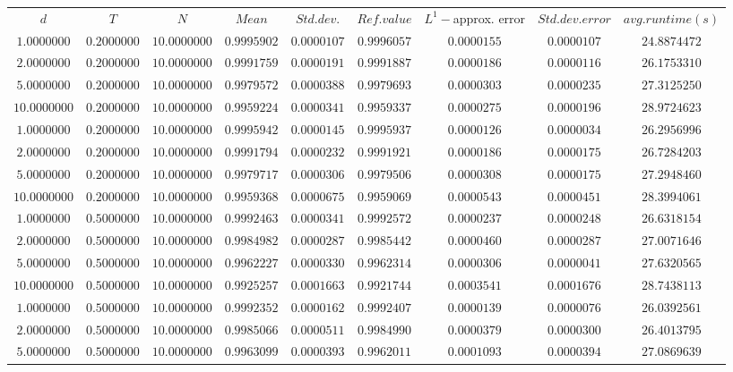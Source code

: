 \begin{tabular}{ccccccccc}
$d$ & $T$ & $N$ & $Mean$ & $Std. dev.$ & $Ref. value$ & $L^1-$approx. error & $Std. dev. error$ & $avg. runtime (s)$\\
$1.0000000$ & $0.2000000$ & $10.0000000$ & $0.9995902$ & $0.0000107$ & $0.9996057$ & $0.0000155$ & $0.0000107$ & $24.8874472$\\
$2.0000000$ & $0.2000000$ & $10.0000000$ & $0.9991759$ & $0.0000191$ & $0.9991887$ & $0.0000186$ & $0.0000116$ & $26.1753310$\\
$5.0000000$ & $0.2000000$ & $10.0000000$ & $0.9979572$ & $0.0000388$ & $0.9979693$ & $0.0000303$ & $0.0000235$ & $27.3125250$\\
$10.0000000$ & $0.2000000$ & $10.0000000$ & $0.9959224$ & $0.0000341$ & $0.9959337$ & $0.0000275$ & $0.0000196$ & $28.9724623$\\
$1.0000000$ & $0.2000000$ & $10.0000000$ & $0.9995942$ & $0.0000145$ & $0.9995937$ & $0.0000126$ & $0.0000034$ & $26.2956996$\\
$2.0000000$ & $0.2000000$ & $10.0000000$ & $0.9991794$ & $0.0000232$ & $0.9991921$ & $0.0000186$ & $0.0000175$ & $26.7284203$\\
$5.0000000$ & $0.2000000$ & $10.0000000$ & $0.9979717$ & $0.0000306$ & $0.9979506$ & $0.0000308$ & $0.0000175$ & $27.2948460$\\
$10.0000000$ & $0.2000000$ & $10.0000000$ & $0.9959368$ & $0.0000675$ & $0.9959069$ & $0.0000543$ & $0.0000451$ & $28.3994061$\\
$1.0000000$ & $0.5000000$ & $10.0000000$ & $0.9992463$ & $0.0000341$ & $0.9992572$ & $0.0000237$ & $0.0000248$ & $26.6318154$\\
$2.0000000$ & $0.5000000$ & $10.0000000$ & $0.9984982$ & $0.0000287$ & $0.9985442$ & $0.0000460$ & $0.0000287$ & $27.0071646$\\
$5.0000000$ & $0.5000000$ & $10.0000000$ & $0.9962227$ & $0.0000330$ & $0.9962314$ & $0.0000306$ & $0.0000041$ & $27.6320565$\\
$10.0000000$ & $0.5000000$ & $10.0000000$ & $0.9925257$ & $0.0001663$ & $0.9921744$ & $0.0003541$ & $0.0001676$ & $28.7438113$\\
$1.0000000$ & $0.5000000$ & $10.0000000$ & $0.9992352$ & $0.0000162$ & $0.9992407$ & $0.0000139$ & $0.0000076$ & $26.0392561$\\
$2.0000000$ & $0.5000000$ & $10.0000000$ & $0.9985066$ & $0.0000511$ & $0.9984990$ & $0.0000379$ & $0.0000300$ & $26.4013795$\\
$5.0000000$ & $0.5000000$ & $10.0000000$ & $0.9963099$ & $0.0000393$ & $0.9962011$ & $0.0001093$ & $0.0000394$ & $27.0869639$\\

\end{tabular}
